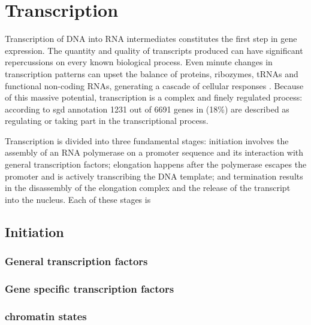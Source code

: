 \chapter{Transcription}

Transcription of DNA into RNA intermediates constitutes the first step in gene expression.
The quantity and quality of transcripts produced can have significant repercussions on every known biological process.
Even minute changes in transcription patterns can upset the balance of proteins, ribozymes, tRNAs and functional non-coding RNAs, generating a cascade of cellular responses . 
Because of this massive potential, transcription is a complex and finely regulated process: according to \gls{sgd} annotation 1231 out of 6691 genes in \cer (18\%) are described as regulating or taking part in the transcriptional process.

Transcription is divided into three fundamental stages: initiation involves the assembly of an RNA polymerase on a promoter sequence and its interaction with general transcription factors; elongation happens after the polymerase escapes the promoter and is actively transcribing the DNA template; and termination results in the disassembly of the elongation complex and the release of the transcript into the nucleus. 
Each of these stages is 



\section{Initiation}

\subsection{General transcription factors}
\subsection{Gene specific transcription factors}
\subsection{chromatin states}

